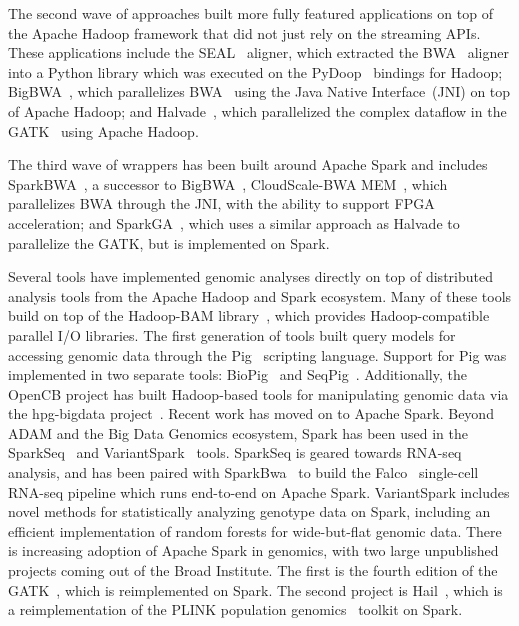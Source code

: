 \documentclass[phd]{ucbthesis}
\begin{document}
The second wave of approaches
built more fully featured applications on top of the {Apache Hadoop}
framework that did not just rely on the streaming APIs. These applications
include the {SEAL}~\cite{pireddu11} aligner, which extracted the
{BWA}~\cite{li09} aligner into a Python library which was executed
on the {PyDoop}~\cite{leo10} bindings for {Hadoop};
{BigBWA}~\cite{abuin15}, which parallelizes {BWA}~\cite{li09}
using the Java Native Interface~(JNI) on top of {Apache Hadoop}; and
{Halvade}~\cite{decap15}, which parallelized the complex dataflow in
the {GATK}~\cite{depristo11} using {Apache Hadoop}.

The third
wave of wrappers has been built around {Apache Spark} and includes
{SparkBWA}~\cite{abuin16}, a successor to {BigBWA}~\cite{abuin15},
{CloudScale-BWA MEM}~\cite{chen16}, which parallelizes
{BWA} through the JNI, with the ability to support {FPGA}
acceleration; and {SparkGA}~\cite{mushtaq17}, which uses a similar
approach as {Halvade} to parallelize the {GATK}, but is
implemented on {Spark}.

Several tools have implemented genomic analyses directly on top of distributed
analysis tools from the {Apache Hadoop} and {Spark} ecosystem.
Many of these tools build on top of the {Hadoop-BAM}
library~\cite{niemenmaa12}, which provides {Hadoop}-compatible parallel
I/O libraries. The first generation of tools built query models for accessing
genomic data through the {Pig}~\cite{olston08} scripting language.
Support for {Pig} was implemented in two separate tools: {BioPig}~\cite{nordberg13}
and {SeqPig}~\cite{schumacher14}. Additionally, the {OpenCB}
project has built {Hadoop}-based tools for manipulating genomic data via
the {hpg-bigdata} project~\cite{opencb}. Recent work has moved on to
{Apache Spark}. Beyond {ADAM} and the {Big Data Genomics}
ecosystem, {Spark} has been used in the
{SparkSeq}~\cite{wiewiorka14} and {VariantSpark}~\cite{obrien15}
tools. {SparkSeq} is geared towards RNA-seq analysis, and has been
paired with {SparkBwa}~\cite{abuin16} to build the
{Falco}~\cite{yang16} single-cell RNA-seq pipeline which runs end-to-end
on {Apache Spark}. {VariantSpark} includes novel methods for
statistically analyzing genotype data on {Spark}, including an efficient
implementation of random forests for wide-but-flat genomic data. There is
increasing adoption of {Apache Spark} in genomics, with two large
unpublished projects coming out of the Broad Institute. The first is the fourth
edition of the {GATK}~\cite{gatk4}, which is reimplemented on
{Spark}. The second project is {Hail}~\cite{hail}, which is a
reimplementation of the {PLINK} population genomics~\cite{purcell07}
toolkit on {Spark}.
\end{document}
